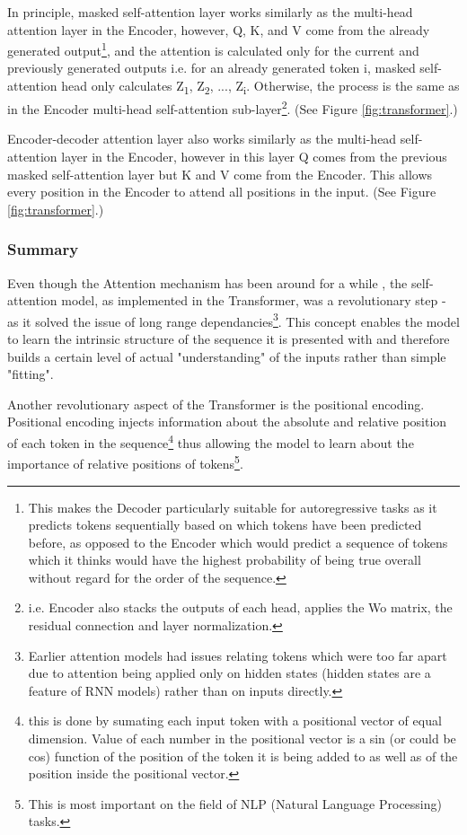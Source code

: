 In principle, masked self-attention layer works similarly as the multi-head attention layer in the Encoder, however, Q, K, and V come from the already generated output\footnote{This makes the Decoder particularly suitable for autoregressive tasks as it predicts tokens sequentially based on which tokens have been predicted before, as opposed to the Encoder which would predict a sequence of tokens which it thinks would have the highest probability of being true overall without regard for the order of the sequence.}, and the attention is calculated only for the current and previously generated outputs i.e. for an already generated token i, masked self-attention head only calculates Z\textsubscript{1}, Z\textsubscript{2}, ..., Z\textsubscript{i}. Otherwise, the process is the same as in the Encoder multi-head self-attention sub-layer\footnote{i.e. Encoder also stacks the outputs of each head, applies the Wo matrix, the residual connection and layer normalization.}. (See Figure \ref{fig:transformer}.)

Encoder-decoder attention layer also works similarly as the multi-head self-attention layer in the Encoder, however in this layer Q comes from the previous masked self-attention layer but K and V come from the Encoder. This allows every position in the Encoder to attend all positions in the input. (See Figure \ref{fig:transformer}.)


\subsubsection{Summary}

Even though the Attention mechanism has been around for a while \cite{bahdanau2014neural}, the self-attention model, as implemented in the Transformer, was a revolutionary step - as it solved the issue of long range dependancies\footnote{Earlier attention models had issues relating tokens which were too far apart due to attention being applied only on hidden states (hidden states are a feature of RNN models) rather than on inputs directly.}. This concept enables the model to learn the intrinsic structure of the sequence it is presented with and therefore builds a certain level of actual "understanding" of the inputs rather than simple "fitting". 

Another revolutionary aspect of the Transformer is the positional encoding. Positional encoding injects information about the absolute and relative position of each token in the sequence\footnote{this is done by sumating each input token with a positional vector of equal dimension. Value of each number in the positional vector is a sin (or could be cos) function of the position of the token it is being added to as well as of the position inside the positional vector.} thus allowing the model to learn about the importance of relative positions of tokens\footnote{This is most important on the field of NLP (Natural Language Processing) tasks.}.

